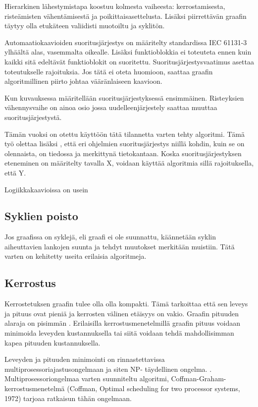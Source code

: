 \documentclass[finnish,12pt]{article}
\begin{document}
Hierarkinen lähestymistapa koostuu kolmesta vaiheesta: kerrostamisesta, risteämisten vähentämisestä ja poikittaisasettelusta. Lisäksi piirrettävän graafin täytyy olla etukäteen valiidisti muotoiltu ja syklitön.

Automaatiokaavioiden suoritusjärjestys on määritelty standardissa IEC 61131-3 ylhäältä alas, vasemmalta oikealle. Lisäksi funktioblokkia ei toteuteta ennen kuin kaikki sitä edeltävät funktioblokit on suoritettu. Suoritusjärjestysvaatimus asettaa toteutukselle rajoituksia. Jos tätä ei oteta huomioon, saattaa graafin algoritmillinen piirto johtaa vääränlaiseen kaavioon.

Kun kuvauksessa määritellään suoritusjärjestyksessä ensimmäinen. Risteyksien vähennysvaihe on ainoa osio jossa uudelleenjärjestely saattaa muuttaa suoritusjärjestystä. 

Tämän vuoksi on otettu käyttöön tätä tilannetta varten tehty algoritmi. Tämä työ olettaa lisäksi , että eri ohjelmien suoritusjärjestys niillä kohdin, kuin se on olennaista, on tiedossa ja merkittynä tietokantaan. Koska suoritusjärjestyksen eteneminen on määritelty tavalla X, voidaan käyttää algoritmia sillä rajoituksella, että Y. 

Logiikkakaavioissa on usein 

		\subsection{Syklien poisto}

Jos graafissa on syklejä, eli graafi ei ole suunnattu, käännetään syklin aiheuttavien lankojen suunta ja tehdyt muutokset merkitään muistiin.
Tätä varten on kehitetty useita erilaisia algoritmeja.

		\subsection{Kerrostus}

Kerrostetuksen graafin tulee olla olla kompakti. Tämä tarkoittaa että sen leveys ja pituus ovat pieniä ja kerrosten välinen etäisyys on vakio. Graafin pituuden alaraja on pisimmän . Erilaisilla kerrostusmenetelmillä graafin pituus voidaan minimoida leveyden kustannuksella tai siitä voidaan tehdä mahdollisimman kapea pituuden kustannuksella.

Leveyden ja pituuden minimointi on  rinnastettavissa multiprosessoriajastusongelmaan ja siten NP- täydellinen ongelma. \cite{RefWorks:39}. Multiprosessoriongelmaa varten suunniteltu algoritmi, Coffman-Graham-kerrostusmenetelmä (Coffman, Optimal scheduling for two processor systems, 1972) tarjoaa ratkaisun tähän ongelmaan.
\end{document}
